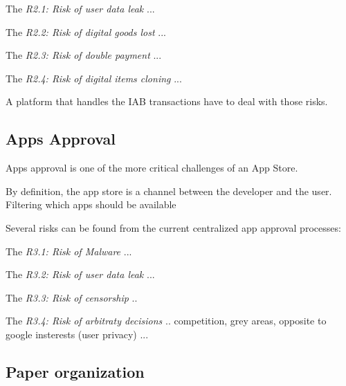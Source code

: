 The {\em R2.1: Risk of user data leak} ...

The {\em R2.2: Risk of digital goods lost} ...

The {\em R2.3: Risk of double payment} ...

The {\em R2.4: Risk of digital items cloning} ...

A platform that handles the IAB transactions have to deal with those risks.


\subsection{Apps Approval}


Apps approval is one of the more critical challenges of an App Store.

By definition, the app store is a channel between the developer and the user. Filtering which apps should be available 


Several risks can be found from the current centralized app approval processes:

The {\em R3.1: Risk of Malware} ...

The {\em R3.2: Risk of user data leak} ...

The {\em R3.3: Risk of censorship} ..

The {\em R3.4: Risk of arbitraty decisions} .. competition, grey areas, opposite to google insterests (user privacy) ...



\subsection{Paper organization}


